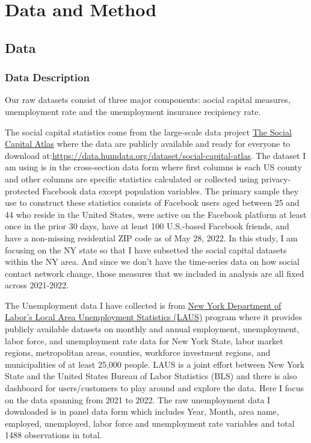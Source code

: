 \documentclass{article}
\begin{document}


\section{Data and Method}

\subsection{Data}

\subsubsection{Data Description}

Our raw datasets consist of three major components: aocial capital measures, unemployment rate and the unemployment insurance recipiency rate.


The social capital statistics come from the large-scale data project \href{https://socialcapital.org}{The Social Capital Atlas} where the data are publicly available and ready for everyone to download at:\url{https://data.humdata.org/dataset/social-capital-atlas}. The dataset I am using is in the cross-section data form where first columns is each US county and other columns are specific statistics calculated or collected using privacy-protected Facebook data except population variables. The primary sample they use to construct these statistics consists of Facebook users aged between 25 and 44 who reside in the United States, were active on the Facebook platform at least once in the prior 30 days, have at least 100 U.S.-based Facebook friends, and have a non-missing residential ZIP code as of May 28, 2022. In this study, I am focusing on the NY state so that I have subsetted the social capital datasets within the NY area. And since we don't have the time-series data on how social contact network change, those measures that we included in analysis are all fixed across 2021-2022.

The Unemployment data I have collected is from \href{https://dol.ny.gov/local-area-unemployment-statistics}{New York Department of Labor's Local Area Unemployment Statistics (LAUS)} program where it provides publicly available datasets on monthly and annual employment, unemployment, labor force, and unemployment rate data for New York State, labor market regions, metropolitan areas, counties, workforce investment regions, and municipalities of at least 25,000 people. LAUS is a joint effort between New York State and the United States Bureau of Labor Statistics (BLS) and there is also dashboard for users/customers to play around and explore the data. Here I focus on the data spanning from 2021 to 2022. The raw unemployment data I downloaded is in panel data form which includes Year, Month, area name, employed, unemployed, labor force and unemployment rate variables and total 1488 observations in total. 
\end{document}
